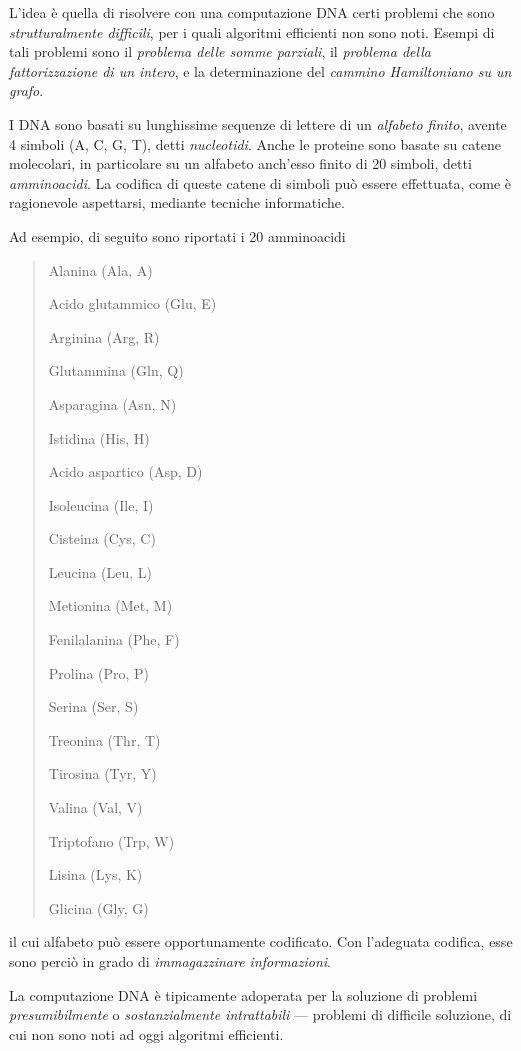 \documentclass[10pt]{\classname}
\theoremstyle{newlinethm}
\theoremstyle{theorem}
\theoremstyle{definition}
\theoremstyle{definition}
\theoremstyle{definition}
\theoremstyle{definition}
\begin{document}
L'idea è quella di risolvere con una computazione DNA certi problemi che sono
\emph{strutturalmente difficili}, per i quali algoritmi efficienti non sono
noti. Esempi di tali problemi sono il \emph{problema delle somme parziali}, il
\emph{problema della fattorizzazione di un intero}, e la determinazione del
\emph{cammino Hamiltoniano su un grafo}.

I DNA sono basati su lunghissime sequenze di lettere di un \emph{alfabeto
finito}, avente 4 simboli (A, C, G, T), detti \emph{nucleotidi}. Anche le
proteine sono basate su catene molecolari, in particolare su un alfabeto
anch'esso finito di 20 simboli, detti \emph{amminoacidi}. La codifica di queste
catene di simboli può essere effettuata, come è ragionevole aspettarsi,
mediante tecniche informatiche.

Ad esempio, di seguito sono riportati i 20 amminoacidi

\begin{quote}
    \footnotesize{
Alanina (Ala, A)

Acido glutammico (Glu, E)

Arginina (Arg, R)

Glutammina (Gln, Q)

Asparagina (Asn, N)

Istidina (His, H)

Acido aspartico (Asp, D) 

Isoleucina (Ile, I)

Cisteina (Cys, C)

Leucina (Leu, L)

Metionina (Met, M)

Fenilalanina (Phe, F)

Prolina (Pro, P)

Serina (Ser, S)

Treonina (Thr, T)

Tirosina (Tyr, Y)

Valina (Val, V)

Triptofano (Trp, W)

Lisina (Lys, K)

Glicina (Gly, G)
}
\end{quote}

il cui alfabeto può essere opportunamente codificato. Con l'adeguata codifica,
esse sono perciò in grado di \emph{immagazzinare informazioni}.

La computazione DNA è tipicamente adoperata per la soluzione di problemi
\emph{presumibilmente} o \emph{sostanzialmente intrattabili} --- problemi di
difficile soluzione, di cui non sono noti ad oggi algoritmi efficienti.
\end{document}
